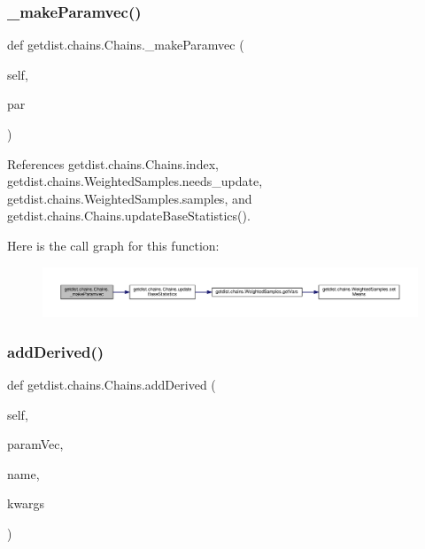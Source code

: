 \subsubsection{\texorpdfstring{\+\_\+make\+Paramvec()}{\_makeParamvec()}}
{\footnotesize\ttfamily def getdist.\+chains.\+Chains.\+\_\+make\+Paramvec (\begin{DoxyParamCaption}\item[{}]{self,  }\item[{}]{par }\end{DoxyParamCaption})\hspace{0.3cm}{\ttfamily [private]}}



References getdist.\+chains.\+Chains.\+index, getdist.\+chains.\+Weighted\+Samples.\+needs\+\_\+update, getdist.\+chains.\+Weighted\+Samples.\+samples, and getdist.\+chains.\+Chains.\+update\+Base\+Statistics().

Here is the call graph for this function\+:
\nopagebreak
\begin{figure}[H]
\begin{center}
\leavevmode
\includegraphics[width=350pt]{classgetdist_1_1chains_1_1Chains_a356b9768604fcc93660fa92170d7857a_cgraph}
\end{center}
\end{figure}
\mbox{\label{classgetdist_1_1chains_1_1Chains_a14d289c78434f27324c29aba89ea535d}} 
\subsubsection{\texorpdfstring{add\+Derived()}{addDerived()}}
{\footnotesize\ttfamily def getdist.\+chains.\+Chains.\+add\+Derived (\begin{DoxyParamCaption}\item[{}]{self,  }\item[{}]{param\+Vec,  }\item[{}]{name,  }\item[{}]{kwargs }\end{DoxyParamCaption})}

